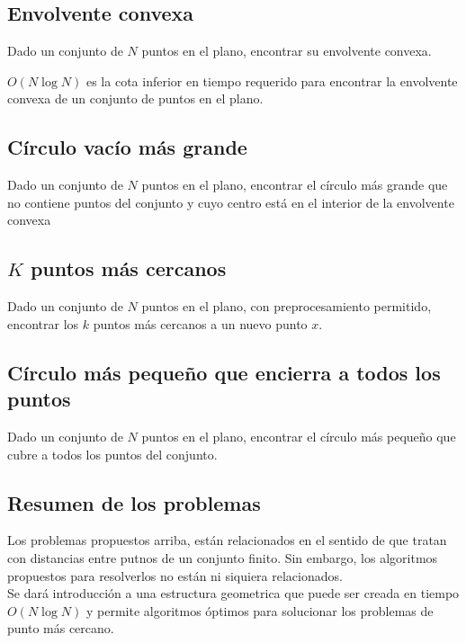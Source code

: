 \subsection{Envolvente convexa}
Dado un conjunto de $N$ puntos en el plano, encontrar su envolvente convexa.

\begin{theorem}
$O(N \log N)$ es la cota inferior en tiempo requerido para encontrar la envolvente convexa de un conjunto de puntos en el plano.
\end{theorem}

\subsection{Círculo vacío más grande}
Dado un conjunto de $N$ puntos en el plano, encontrar el círculo más grande que no contiene puntos del conjunto y cuyo centro está en el interior de la envolvente convexa

\subsection{$K$ puntos más cercanos}
Dado un conjunto de $N$ puntos en el plano, con preprocesamiento permitido, encontrar los $k$ puntos más cercanos a un nuevo punto $x$.

\subsection{Círculo más pequeño que encierra a todos los puntos}
Dado un conjunto de $N$ puntos en el plano, encontrar el círculo más pequeño que cubre a todos los puntos del conjunto.

\subsection{Resumen de los problemas}
Los problemas propuestos arriba, están relacionados en el sentido de que tratan con distancias entre putnos de un conjunto finito. Sin embargo, los algoritmos propuestos para resolverlos no están ni siquiera relacionados. \\
Se dará introducción a una estructura geometrica que puede ser creada en tiempo $O(N \log N)$ y permite algoritmos óptimos para solucionar los problemas de punto más cercano.


